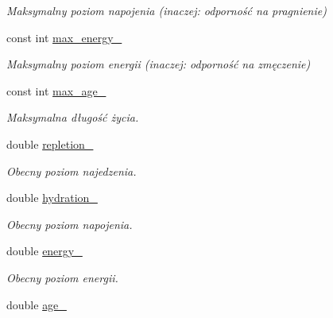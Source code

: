 \begin{DoxyCompactItemize}
\begin{DoxyCompactList}\small\item\em Maksymalny poziom napojenia (inaczej\-: odporność na pragnienie) \end{DoxyCompactList}\item 
\hypertarget{classCreature_a30ca7a39a52b5dc36828fc2ea835a95f}{const int \hyperlink{classCreature_a30ca7a39a52b5dc36828fc2ea835a95f}{max\-\_\-energy\-\_\-}}\label{classCreature_a30ca7a39a52b5dc36828fc2ea835a95f}

\begin{DoxyCompactList}\small\item\em Maksymalny poziom energii (inaczej\-: odporność na zmęczenie) \end{DoxyCompactList}\item 
\hypertarget{classCreature_a3c85c0418b1036d292d4d598082626eb}{const int \hyperlink{classCreature_a3c85c0418b1036d292d4d598082626eb}{max\-\_\-age\-\_\-}}\label{classCreature_a3c85c0418b1036d292d4d598082626eb}

\begin{DoxyCompactList}\small\item\em Maksymalna długość życia. \end{DoxyCompactList}\item 
\hypertarget{classCreature_a48a77085b53f40477bfb6bfc2eb3f241}{double \hyperlink{classCreature_a48a77085b53f40477bfb6bfc2eb3f241}{repletion\-\_\-}}\label{classCreature_a48a77085b53f40477bfb6bfc2eb3f241}

\begin{DoxyCompactList}\small\item\em Obecny poziom najedzenia. \end{DoxyCompactList}\item 
\hypertarget{classCreature_a6650b16786f49d3dbc4dbde39ab21796}{double \hyperlink{classCreature_a6650b16786f49d3dbc4dbde39ab21796}{hydration\-\_\-}}\label{classCreature_a6650b16786f49d3dbc4dbde39ab21796}

\begin{DoxyCompactList}\small\item\em Obecny poziom napojenia. \end{DoxyCompactList}\item 
\hypertarget{classCreature_a64dae275114dc06c39eeb71d9f8e08ed}{double \hyperlink{classCreature_a64dae275114dc06c39eeb71d9f8e08ed}{energy\-\_\-}}\label{classCreature_a64dae275114dc06c39eeb71d9f8e08ed}

\begin{DoxyCompactList}\small\item\em Obecny poziom energii. \end{DoxyCompactList}\item 
\hypertarget{classCreature_abf62d53b9178d950e98fc0167f51b824}{double \hyperlink{classCreature_abf62d53b9178d950e98fc0167f51b824}{age\-\_\-}}\label{classCreature_abf62d53b9178d950e98fc0167f51b824}


\end{DoxyCompactItemize}
